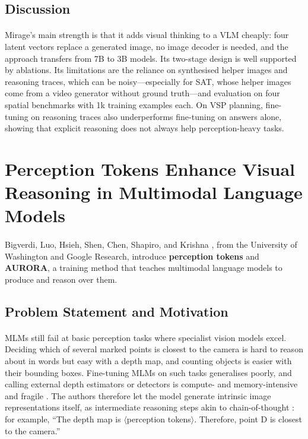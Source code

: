 \documentclass[12pt,a4paper,final]{extreport}
\begin{document}
\subsection{Discussion}

\paragraph{} Mirage's main strength is that it adds visual thinking to a VLM cheaply: four latent vectors replace a generated image, no image decoder is needed, and the approach transfers from 7B to 3B models. Its two-stage design is well supported by ablations. Its limitations are the reliance on synthesised helper images and reasoning traces, which can be noisy---especially for SAT, whose helper images come from a video generator without ground truth---and evaluation on four spatial benchmarks with 1k training examples each. On VSP planning, fine-tuning on reasoning traces also underperforms fine-tuning on answers alone, showing that explicit reasoning does not always help perception-heavy tasks.

\section{Perception Tokens Enhance Visual Reasoning in Multimodal Language Models}

\paragraph{} Bigverdi, Luo, Hsieh, Shen, Chen, Shapiro, and Krishna \cite{p2}, from the University of Washington and Google Research, introduce \textbf{perception tokens} and \textbf{AURORA}, a training method that teaches multimodal language models to produce and reason over them.

\subsection{Problem Statement and Motivation}

\paragraph{} MLMs still fail at basic perception tasks where specialist vision models excel. Deciding which of several marked points is closest to the camera is hard to reason about in words but easy with a depth map, and counting objects is easier with their bounding boxes. Fine-tuning MLMs on such tasks generalises poorly, and calling external depth estimators or detectors is compute- and memory-intensive and fragile \cite{p2}. The authors therefore let the model generate intrinsic image representations itself, as intermediate reasoning steps akin to chain-of-thought \cite{wei2022}: for example, ``The depth map is $\langle$perception tokens$\rangle$. Therefore, point D is closest to the camera.''
\end{document}
